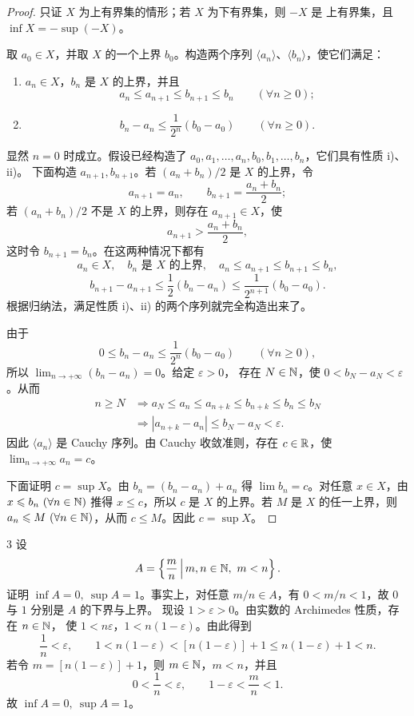 \begin{proof}
只证 \(X\) 为上有界集的情形；若 \(X\) 为下有界集，则 \(-X\) 是
上有界集，且 \(\inf X=-\sup(-X)\)。

取 \(a_0\in X\)，并取 \(X\) 的一个上界 \(b_0\)。构造两个序列
\(\langle a_n\rangle\)、\(\langle b_n\rangle\)，使它们满足：
\begin{enumerate}[label=\roman*)]
  \item \(a_n\in X\)，\(b_n\) 是 \(X\) 的上界，并且
  \[
  a_n\leqslant a_{n+1}\leqslant b_{n+1}\leqslant b_n
  \qquad(\forall n\geqslant0);
  \]
  \item
  \[
  b_n-a_n\leqslant\frac1{2^n}(b_0-a_0)\qquad(\forall n\geqslant0).
  \]
\end{enumerate}
显然 \(n=0\) 时成立。假设已经构造了
\(a_0,a_1,\ldots,a_n,b_0,b_1,\ldots,b_n\)，它们具有性质 i)、ii)。
下面构造 \(a_{n+1},b_{n+1}\)。若 \((a_n+b_n)/2\) 是 \(X\) 的上界，令
\[
a_{n+1}=a_n,\qquad b_{n+1}=\frac{a_n+b_n}{2};
\]
若 \((a_n+b_n)/2\) 不是 \(X\) 的上界，则存在 \(a_{n+1}\in X\)，使
\[
a_{n+1}>\frac{a_n+b_n}{2},
\]
这时令 \(b_{n+1}=b_n\)。在这两种情况下都有
\[
a_n\in X,\quad b_n\text{ 是 }X\text{ 的上界},\quad
a_n\leqslant a_{n+1}\leqslant b_{n+1}\leqslant b_n,
\]
\[
b_{n+1}-a_{n+1}
\leqslant\frac12(b_n-a_n)
\leqslant\frac1{2^{n+1}}(b_0-a_0).
\]
根据归纳法，满足性质 i)、ii) 的两个序列就完全构造出来了。

由于
\[
0\leqslant b_n-a_n\leqslant\frac1{2^n}(b_0-a_0)\qquad(\forall n\geqslant0),
\]
所以 \(\lim_{n\to+\infty}(b_n-a_n)=0\)。给定 \(\varepsilon>0\)，
存在 \(N\in\mathbb{N}\)，使 \(0<b_N-a_N<\varepsilon\)。从而
\[
\begin{aligned}
n\geqslant N&\Longrightarrow
a_N\leqslant a_n\leqslant a_{n+k}\leqslant b_{n+k}\leqslant b_n\leqslant b_N\\
&\Longrightarrow |a_{n+k}-a_n|\leqslant b_N-a_N<\varepsilon.
\end{aligned}
\]
因此 \(\langle a_n\rangle\) 是 Cauchy 序列。由 Cauchy 收敛准则，存在
\(c\in\mathbb{R}\)，使 \(\lim_{n\to+\infty}a_n=c\)。

下面证明 \(c=\sup X\)。由
\(b_n=(b_n-a_n)+a_n\) 得 \(\lim b_n=c\)。对任意 \(x\in X\)，由
\(x\leqslant b_n\ (\forall n\in\mathbb{N})\) 推得 \(x\leqslant c\)，所以 \(c\)
是 \(X\) 的上界。若 \(M\) 是 \(X\) 的任一上界，则
\(a_n\leqslant M\ (\forall n\in\mathbb{N})\)，从而 \(c\leqslant M\)。因此
\(c=\sup X\)。
\end{proof}

\begin{sourceexample}{3}
设
\[
A=\left\{\frac mn\,\middle|\,m,n\in\mathbb{N},\ m<n\right\}.
\]
证明 \(\inf A=0,\ \sup A=1\)。事实上，对任意 \(m/n\in A\)，有
\(0<m/n<1\)，故 \(0\) 与 \(1\) 分别是 \(A\) 的下界与上界。
现设 \(1>\varepsilon>0\)。由实数的 Archimedes 性质，存在 \(n\in\mathbb{N}\)，
使 \(1<n\varepsilon\)，\(1<n(1-\varepsilon)\)。由此得到
\[
\frac1n<\varepsilon,\qquad
1<n(1-\varepsilon)<[n(1-\varepsilon)]+1
\leqslant n(1-\varepsilon)+1<n.
\]
若令 \(m=[n(1-\varepsilon)]+1\)，则 \(m\in\mathbb{N}\)，\(m<n\)，并且
\[
0<\frac1n<\varepsilon,\qquad
1-\varepsilon<\frac mn<1.
\]
故 \(\inf A=0,\ \sup A=1\)。
\end{sourceexample}

